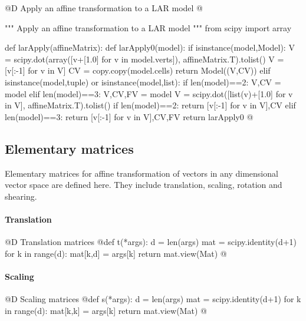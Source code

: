 \documentclass[11pt,oneside]{article}    %
\begin{document}
@D Apply an affine transformation to a LAR model 
@{""" Apply an affine transformation to a LAR model  """
from scipy import array

def larApply(affineMatrix):
    def larApply0(model):
        if isinstance(model,Model):
            V = scipy.dot(array([v+[1.0] for v in model.verts]), affineMatrix.T).tolist()
            V = [v[:-1] for v in V]
            CV = copy.copy(model.cells)
            return Model((V,CV))
        elif isinstance(model,tuple) or isinstance(model,list):
            if len(model)==2: V,CV = model
            elif len(model)==3: V,CV,FV = model
            V = scipy.dot([list(v)+[1.0] for v in V], affineMatrix.T).tolist()
            if len(model)==2: return [v[:-1] for v in V],CV
            elif len(model)==3: return [v[:-1] for v in V],CV,FV
    return larApply0
@}


\subsection{Elementary matrices}
Elementary matrices for affine transformation of vectors in any dimensional vector space are defined here. They include translation, scaling, rotation and shearing. 

\paragraph{Translation}
@D Translation matrices
@{def t(*args): 
    d = len(args)
    mat = scipy.identity(d+1)
    for k in range(d): 
        mat[k,d] = args[k]
    return mat.view(Mat)
@}
\paragraph{Scaling}
@D Scaling matrices
@{def s(*args): 
    d = len(args)
    mat = scipy.identity(d+1)
    for k in range(d): 
        mat[k,k] = args[k]
    return mat.view(Mat)
@}
\end{document}
